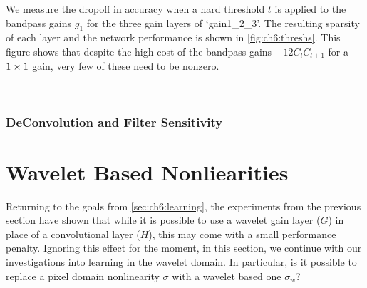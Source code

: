We measure the dropoff in accuracy when a hard threshold $t$ is applied to the 
bandpass gains $g_1$ for the three gain layers of `gain1\_2\_3'. The resulting sparsity
of each layer and the network performance is shown in \autoref{fig:ch6:threshs}.
This figure shows that despite the high cost of the bandpass gains --
$12C_{l}C_{l+1}$ for a $1\times1$ gain, very few of these need to be nonzero.

\begin{figure}
  \centering
  \vspace{-0.5cm}
  \\\vspace{-0.3cm}
  \label{fig:ch6:bp_info}
\end{figure}

\subsubsection{DeConvolution and Filter Sensitivity}

\section{Wavelet Based Nonliearities}
Returning to the goals from \autoref{sec:ch6:learning}, the experiments from the
previous section have shown that while it is possible to use a wavelet gain
layer ($G$) in place of a convolutional layer ($H$), this may come with a small
performance penalty. Ignoring this effect for the moment, in this section, we
continue with our investigations into learning in the wavelet domain. In
particular, is it possible to replace a pixel domain nonlinearity $\sigma$ with
a wavelet based one $\sigma_w$?

